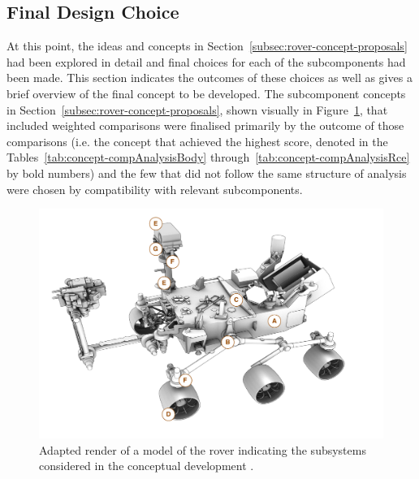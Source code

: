  \subsection{Final Design Choice}
    At this point, the ideas and concepts in Section~\ref{subsec:rover-concept-proposals} had been explored in detail and final choices for each of the subcomponents had been made. This section indicates the outcomes of these choices as well as gives a brief overview of the final concept to be developed. The subcomponent concepts in Section~\ref{subsec:rover-concept-proposals}, shown visually in Figure~\ref{fig:concepts-finalconceptrender}, that included weighted comparisons were finalised primarily by the outcome of those comparisons (i.e. the concept that achieved the highest score, denoted in the Tables~\ref{tab:concept-compAnalysisBody} through~\ref{tab:concept-compAnalysisRce} by bold numbers) and the few that did not follow the same structure of analysis were chosen by compatibility with relevant subcomponents.
    
    \begin{figure}[H]
      \centering
      \includegraphics[width=1\linewidth]{figures/concepts-finalConceptRender}
      \caption[Adapted render of a model of the rover indicating the subsystems considered in the conceptual development.]{Adapted render of a model of the rover indicating the subsystems considered in the conceptual development \cite{nasa3D}.}
      \label{fig:concepts-finalconceptrender}
    \end{figure}
    
